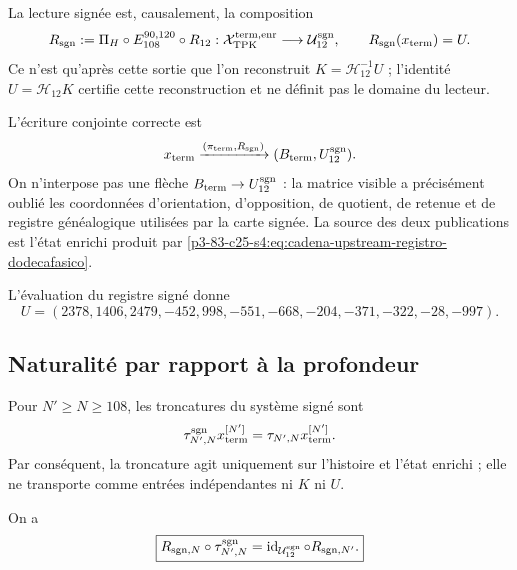 \begin{definition}
\begin{equation}
 \label{p3-83-c25-s4:eq:modulo-publicacion-firmada}
\end{equation}
La lecture signée est, causalement, la composition
\begin{equation}
 R_{\rm sgn}:=
 \Pi_H\circ E_{108}^{90,120}\circ R_{12}:
 \mathcal X_{\rm TPK}^{\rm term,enr}
 \longrightarrow\mathcal U_{12}^{\rm sgn},
 \qquad
 R_{\rm sgn}(x_{\rm term})=U.
 \label{p3-83-c25-s4:eq:lector-firmado-terminal}
\end{equation}
Ce n’est qu’après cette sortie que l’on reconstruit
\(K=\mathcal H_{12}^{-1}U\) ; l’identité
\(U=\mathcal H_{12}K\) certifie cette reconstruction et ne définit pas le domaine
du lecteur.
\end{definition}

L’écriture conjointe correcte est
\begin{equation}
 x_{\rm term}
 \xrightarrow{(\pi_{\rm term},R_{\rm sgn})}
 (B_{\rm term},U_{12}^{\rm sgn}).
 \label{p3-83-c25-s4:eq:doble-publicacion-terminal}
\end{equation}
On n’interpose pas une flèche
\(B_{\rm term}\to U_{12}^{\rm sgn}\) : la matrice visible a précisément oublié
les coordonnées d’orientation, d’opposition, de quotient, de retenue et de
registre généalogique utilisées par la carte signée. La source des deux publications est
l’état enrichi produit par \eqref{p3-83-c25-s4:eq:cadena-upstream-registro-dodecafasico}.

L’évaluation du registre signé donne
\begin{equation}
 \boxed{
 U=(2378,1406,2479,-452,998,-551,
 -668,-204,-371,-322,-28,-997).}
 \label{p3-83-c25-s4:eq:vector-u-firmado-autonomo}
\end{equation}

\subsection{Naturalité par rapport à la profondeur}

Pour \(N'\geq N\geq108\), les troncatures du système signé sont
\begin{equation}
 \tau_{N',N}^{\rm sgn}
 x_{\rm term}^{[N']}
 =\tau_{N',N}x_{\rm term}^{[N']}.
 \label{p3-83-c25-s4:eq:truncamiento-preserva-ku-autonomo}
\end{equation}
Par conséquent, la troncature agit uniquement sur l’histoire et l’état
enrichi ; elle ne transporte comme entrées indépendantes ni \(K\) ni \(U\).

\begin{theorem}
\label{p3-83-c25-s4:thm:naturalidad-lector-firmado-autonomo}
On a
\begin{equation}
 \boxed{
 R_{{\rm sgn},N}\circ\tau_{N',N}^{\rm sgn}
 =\operatorname{id}_{\mathcal U_{12}^{\rm sgn}}
  \circ R_{{\rm sgn},N'}.}
 \label{p3-83-c25-s4:eq:cuadrado-naturalidad-lector-firmado}
\end{equation}
\end{theorem}

